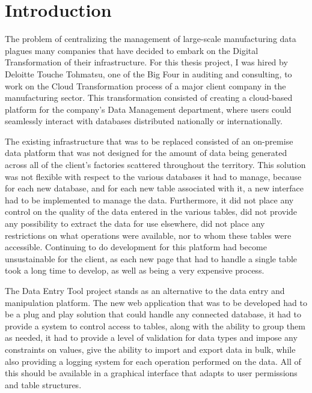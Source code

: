 \chapter{Introduction}
The problem of centralizing the management of large-scale manufacturing data plagues many companies that have decided to embark on the Digital Transformation of their infrastructure. For this thesis project, I was hired by Deloitte Touche Tohmatsu, one of the Big Four in auditing and consulting, to work on the Cloud Transformation process of a major client company in the manufacturing sector. 
This transformation consisted of creating a cloud-based platform for the company's Data Management department, where users could seamlessly interact with databases distributed nationally or internationally.


The existing infrastructure that was to be replaced consisted of an on-premise data platform that was not designed for the amount of data being generated across all of the client's factories scattered throughout the territory. This solution was not flexible with respect to the various databases it had to manage, because for each new database, and for each new table associated with it, a new interface had to be implemented to manage the data. Furthermore, it did not place any control on the quality of the data entered in the various tables, did not provide any possibility to extract the data for use elsewhere, did not place any restrictions on what operations were available, nor to whom these tables were accessible.
Continuing to do development for this platform had become unsustainable for the client, as each new page that had to handle a single table took a long time to develop, as well as being a very expensive process.


The Data Entry Tool project stands as an alternative to the data entry and manipulation platform. The new web application that was to be developed had to be a plug and play solution that could handle any connected database, it had to provide a system to control access to tables, along with the ability to group them as needed, it had to provide a level of validation for data types and impose any constraints on values, give the ability to import and export data in bulk, while also providing a logging system for each operation performed on the data. All of this should be available in a graphical interface that adapts to user permissions and table structures.


